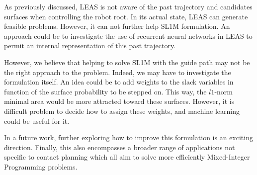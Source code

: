 As previously discussed, LEAS is not aware of the past trajectory and candidates surfaces when controlling the robot root. 
In its actual state, LEAS can generate feasible problems. However, it can not further help SL1M formulation.
An approach could be to investigate the use of recurrent neural networks in LEAS to permit an internal representation of this past trajectory.

However, we believe that helping to solve SL1M with the guide path may not be the right approach to the problem.
Indeed, we may have to investigate the formulation itself.
An idea could be to add weights to the slack variables in function of the surface probability to be stepped on.
This way, the $l1$-norm minimal area would be more attracted toward these surfaces. 
However, it is difficult problem to decide how to assign these weights, and machine learning could be useful for it.

In a future work, further exploring how to improve this formulation is an exciting direction. 
Finally, this also encompasses a broader range of applications not specific to contact planning which all aim to solve more efficiently Mixed-Integer Programming problems.